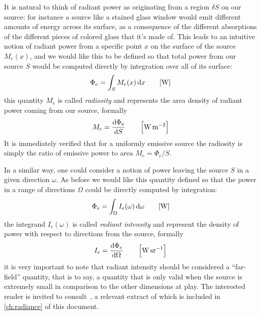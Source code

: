 It is natural to think of radiant power as originating from a region $\delta S$ on our source:
for instance a source like a stained glass window would emit different amounts of energy 
across its surface, as a consequence of the different absorptions of the different pieces of
colored glass that it's made of. 
This leads to an intuitive notion of radiant power from a specific point $x$ on the surface 
of the source $M_e(x)$, and we would like this to be defined so that total power 
from our source $S$ would be computed directly by integration over all of its surface:
\begin{displaymath}
\Phi_e = \int_{S} M_e(x) \d x \qquad [\unit{\watt}]
\end{displaymath}
this quantity $M_e$ is called \textsl{radiosity} and represents the area density
of radiant power coming from our source, formally
\begin{displaymath}
M_e = \frac{\d\Phi_e}{\d S} \qquad \left[\unit{\watt\per\square\meter}\right]
\end{displaymath}
It is immediately verified that for a uniformly emissive source the
radiosity is simply the ratio of emissive power to area
$M_e = \Phi_e / S$.

In a similar way, one could consider a notion of power leaving the source $S$ in
a given
direction $\omega$.
As before we would like this quantity defined so that the power in a range of
directions
$\Omega$ could be directly computed by integration:
\begin{displaymath}
\Phi_e = \int_\Omega I_e(\omega) \d\omega \qquad [\unit{\watt}]
\end{displaymath}
the integrand $I_e(\omega)$ is called \textsl{radiant intensity} and represent
the density
of power with respect to directions from the source, formally
\begin{displaymath}
I_e = \frac{\d\Phi_e}{\d\Omega} \qquad \left[\unit{\watt\per\steradian}\right]
\end{displaymath}
it is very important to note that radiant intensity should be considered a
``far-field'' quantity, that is to say, a quantity that is only valid when
the source is extremely small in comparison to the other dimensions at play.
The interested reader is invited to consult~\cite{nicodemus63}, a relevant
extract of which is included in \cref{ch:radiance} of this document.

